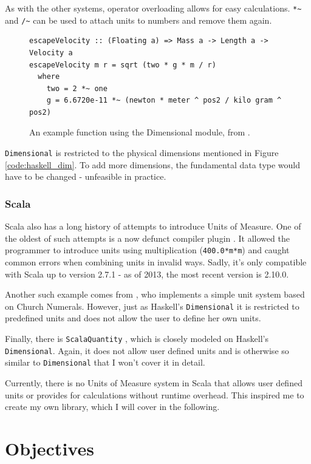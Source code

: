 \documentclass[12pt,oneside,a4paper]{scrbook}
\theoremstyle{definition}
\begin{document}
As with the other systems, operator overloading allows for easy calculations. \verb/*~/ and \verb|/~| can be used to attach units to numbers and remove them again.


\begin{figure}
\begin{verbatim}
escapeVelocity :: (Floating a) => Mass a -> Length a -> Velocity a
escapeVelocity m r = sqrt (two * g * m / r)
  where
    two = 2 *~ one
    g = 6.6720e-11 *~ (newton * meter ^ pos2 / kilo gram ^ pos2)
\end{verbatim}
\caption{An example function using the Dimensional module, from \citep{Buckwalter06}.}
\label{code:haskell_dimensional}
\end{figure}

\verb/Dimensional/ is restricted to the physical dimensions mentioned in Figure \ref{code:haskell_dim}. To add more dimensions, the fundamental data type would have to be changed - unfeasible in practice.


\subsection{Scala}

Scala also has a long history of attempts to introduce Units of Measure. One of the oldest of such attempts is a now defunct compiler plugin \citep{Nygard09}. It allowed the programmer to introduce units using multiplication (\verb/400.0*m*m/) and caught common errors when combining units in invalid ways. Sadly, it's only compatible with Scala up to version 2.7.1 - as of 2013, the most recent version is 2.10.0.

Another such example comes from \citep{McBeath08}, who implements a simple unit system based on Church Numerals. However, just as Haskell's \verb/Dimensional/ it is restricted to predefined units and does not allow the user to define her own units.

Finally, there is \verb/ScalaQuantity/ \citep{Hans12}, which is closely modeled on Haskell's \verb/Dimensional/. Again, it does not allow user defined units and is otherwise so similar to \verb/Dimensional/ that I won't cover it in detail.

Currently, there is no Units of Measure system in Scala that allows user defined units or provides for calculations without runtime overhead. This inspired me to create my own library, which I will cover in the following.

\chapter{Objectives}
\end{document}
